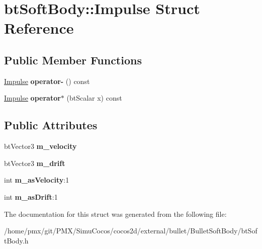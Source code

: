 \hypertarget{structbtSoftBody_1_1Impulse}{}\section{bt\+Soft\+Body\+:\+:Impulse Struct Reference}
\label{structbtSoftBody_1_1Impulse}
\subsection*{Public Member Functions}
\begin{DoxyCompactItemize}
\item 
\mbox{\label{structbtSoftBody_1_1Impulse_a44b66c5eb81d6b37e0a63354cc4b0411}} 
\hyperlink{structbtSoftBody_1_1Impulse}{Impulse} {\bfseries operator-\/} () const
\item 
\mbox{\label{structbtSoftBody_1_1Impulse_a310102430db1f71f29fad1355001542e}} 
\hyperlink{structbtSoftBody_1_1Impulse}{Impulse} {\bfseries operator$\ast$} (bt\+Scalar x) const
\end{DoxyCompactItemize}
\subsection*{Public Attributes}
\begin{DoxyCompactItemize}
\item 
\mbox{\label{structbtSoftBody_1_1Impulse_a8456d87d37e70f0734f6f374d2793899}} 
bt\+Vector3 {\bfseries m\+\_\+velocity}
\item 
\mbox{\label{structbtSoftBody_1_1Impulse_a264b6b2fd236213db5e79322cef5f327}} 
bt\+Vector3 {\bfseries m\+\_\+drift}
\item 
\mbox{\label{structbtSoftBody_1_1Impulse_ae607701d136e2334189803d44f3a2211}} 
int {\bfseries m\+\_\+as\+Velocity}\+:1
\item 
\mbox{\label{structbtSoftBody_1_1Impulse_a48e0f46f144d9cacca2333788d3df56d}} 
int {\bfseries m\+\_\+as\+Drift}\+:1
\end{DoxyCompactItemize}


The documentation for this struct was generated from the following file\+:\begin{DoxyCompactItemize}
\item 
/home/pmx/git/\+P\+M\+X/\+Simu\+Cocos/cocos2d/external/bullet/\+Bullet\+Soft\+Body/bt\+Soft\+Body.\+h\end{DoxyCompactItemize}
